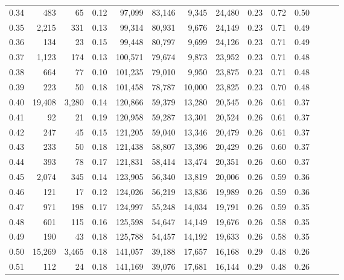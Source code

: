 \begin{tabular}{rrrrrrrrrrrrrr}
0.34 &     483 &     65 &  0.12 &   97,099 &   83,146 &   9,345 &  24,480 &  0.23 &  0.72 &      0.50 \\
0.35 &   2,215 &    331 &  0.13 &   99,314 &   80,931 &   9,676 &  24,149 &  0.23 &  0.71 &      0.49 \\
0.36 &     134 &     23 &  0.15 &   99,448 &   80,797 &   9,699 &  24,126 &  0.23 &  0.71 &      0.49 \\
0.37 &   1,123 &    174 &  0.13 &  100,571 &   79,674 &   9,873 &  23,952 &  0.23 &  0.71 &      0.48 \\
0.38 &     664 &     77 &  0.10 &  101,235 &   79,010 &   9,950 &  23,875 &  0.23 &  0.71 &      0.48 \\
0.39 &     223 &     50 &  0.18 &  101,458 &   78,787 &  10,000 &  23,825 &  0.23 &  0.70 &      0.48 \\
0.40 &  19,408 &  3,280 &  0.14 &  120,866 &   59,379 &  13,280 &  20,545 &  0.26 &  0.61 &      0.37 \\
0.41 &      92 &     21 &  0.19 &  120,958 &   59,287 &  13,301 &  20,524 &  0.26 &  0.61 &      0.37 \\
0.42 &     247 &     45 &  0.15 &  121,205 &   59,040 &  13,346 &  20,479 &  0.26 &  0.61 &      0.37 \\
0.43 &     233 &     50 &  0.18 &  121,438 &   58,807 &  13,396 &  20,429 &  0.26 &  0.60 &      0.37 \\
0.44 &     393 &     78 &  0.17 &  121,831 &   58,414 &  13,474 &  20,351 &  0.26 &  0.60 &      0.37 \\
0.45 &   2,074 &    345 &  0.14 &  123,905 &   56,340 &  13,819 &  20,006 &  0.26 &  0.59 &      0.36 \\
0.46 &     121 &     17 &  0.12 &  124,026 &   56,219 &  13,836 &  19,989 &  0.26 &  0.59 &      0.36 \\
0.47 &     971 &    198 &  0.17 &  124,997 &   55,248 &  14,034 &  19,791 &  0.26 &  0.59 &      0.35 \\
0.48 &     601 &    115 &  0.16 &  125,598 &   54,647 &  14,149 &  19,676 &  0.26 &  0.58 &      0.35 \\
0.49 &     190 &     43 &  0.18 &  125,788 &   54,457 &  14,192 &  19,633 &  0.26 &  0.58 &      0.35 \\
0.50 &  15,269 &  3,465 &  0.18 &  141,057 &   39,188 &  17,657 &  16,168 &  0.29 &  0.48 &      0.26 \\
0.51 &     112 &     24 &  0.18 &  141,169 &   39,076 &  17,681 &  16,144 &  0.29 &  0.48 &      0.26 \\

\end{tabular}
